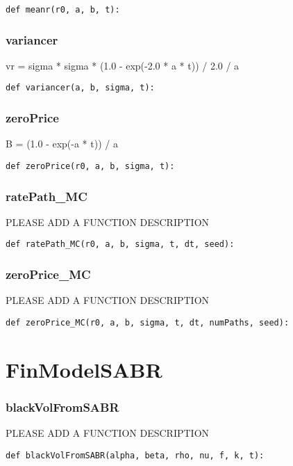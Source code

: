 \documentclass[twoside,11pt]{book}
\begin{document}
\begin{lstlisting}
def meanr(r0, a, b, t):
\end{lstlisting}

\subsubsection*{{\bf variancer}}
vr = sigma * sigma * (1.0 - exp(-2.0 * a * t)) / 2.0 / a 

\begin{lstlisting}
def variancer(a, b, sigma, t):
\end{lstlisting}

\subsubsection*{{\bf zeroPrice}}
B = (1.0 - exp(-a * t)) / a 

\begin{lstlisting}
def zeroPrice(r0, a, b, sigma, t):
\end{lstlisting}

\subsubsection*{{\bf ratePath\_MC}}
PLEASE ADD A FUNCTION DESCRIPTION

\begin{lstlisting}
def ratePath_MC(r0, a, b, sigma, t, dt, seed):
\end{lstlisting}

\subsubsection*{{\bf zeroPrice\_MC}}
PLEASE ADD A FUNCTION DESCRIPTION

\begin{lstlisting}
def zeroPrice_MC(r0, a, b, sigma, t, dt, numPaths, seed):
\end{lstlisting}

\newpage
\section{FinModelSABR}

\subsubsection*{{\bf blackVolFromSABR}}
PLEASE ADD A FUNCTION DESCRIPTION

\begin{lstlisting}
def blackVolFromSABR(alpha, beta, rho, nu, f, k, t):
\end{lstlisting}
\end{document}
